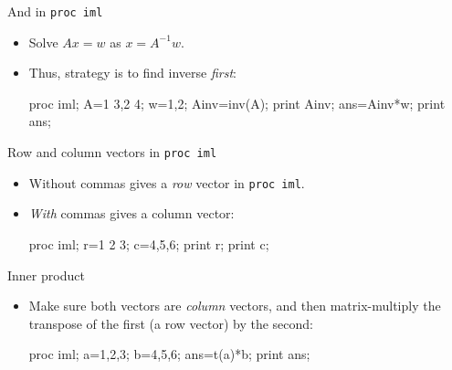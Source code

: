 \documentclass[unknownkeysallowed]{beamer}\usepackage[]{graphicx}\usepackage[]{color}
\begin{document}
\begin{frame}[fragile]{And in \texttt{proc iml}}
  
  \begin{itemize}
    \item Solve $Ax=w$ as $x=A^{-1}w$.
  \item Thus, strategy is to find inverse \emph{first}:
    
    \begin{Sascode}[store=img]
proc iml;
  A={1 3,2 4};
  w={1,2};
  Ainv=inv(A);
  print Ainv;
  ans=Ainv*w;
  print ans;
    \end{Sascode}
    
    
    
  \end{itemize}
  
\end{frame}

\begin{frame}[fragile]{Row and column vectors in \texttt{proc iml}}
  
  \begin{itemize}
  \item Without commas gives a \emph{row} vector in \texttt{proc iml}.
  \item \emph{With} commas gives a column vector:
    
    \begin{Sascode}[store=imh]
proc iml;
  r={1 2 3};
  c={4,5,6};
  print r;
  print c;
    \end{Sascode}
    
  \end{itemize}
  
\end{frame}

\begin{frame}[fragile]{Inner product}
  
  \begin{itemize}
  \item Make sure both vectors are \emph{column} vectors, and then
    matrix-multiply the transpose of the first (a row vector) by the second:
    
    \begin{Sascode}[store=imi]
proc iml;
  a={1,2,3};
  b={4,5,6};
  ans=t(a)*b;
  print ans;
    \end{Sascode}
    
  \end{itemize}
  
\end{frame}
\end{document}
